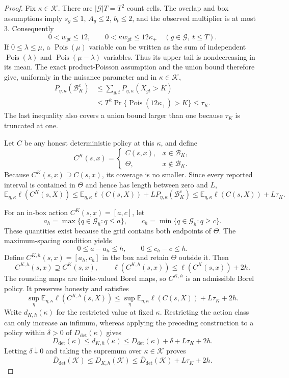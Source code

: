\documentclass{article}
\begin{document}
\begin{proof}
Fix \(\kappa\in\mathcal K\).  There are \(|\mathcal G|T=T^2\) count cells.  The overlap and box assumptions imply \(s_g\le 1\), \(A_g\le2\), \(b_t\le2\), and the observed multiplier is at most \(3\).  Consequently
\[
  0<w_{gt}\le 12,
  \qquad
  0<\kappa w_{gt}\le12\kappa_+
  \quad(g\in\mathcal G,\ t\le T).
\]
If \(0\le\lambda\le\mu\), a \(\operatorname{Pois}(\mu)\) variable can be written as the sum of independent \(\operatorname{Pois}(\lambda)\) and \(\operatorname{Pois}(\mu-\lambda)\) variables.  Thus its upper tail is nondecreasing in its mean.  The exact product-Poisson assumption and the union bound therefore give, uniformly in the nuisance parameter and in \(\kappa\in\mathcal K\),
\[
 \begin{split}
 P_{\eta,\kappa}(\mathcal B_K^c)
 &\le \sum_{g,t}P_{\eta,\kappa}(X_{gt}>K)\\
 &\le T^2\Pr\{\operatorname{Pois}(12\kappa_+)>K\}
 \le \tau_K .
 \end{split}
\]
The last inequality also covers a union bound larger than one because \(\tau_K\) is truncated at one.

Let \(C\) be any honest deterministic policy at this \(\kappa\), and define
\[
 C^K(s,x)=
 \begin{cases}
 C(s,x),&x\in\mathcal B_K,\\
 \Theta,&x\notin\mathcal B_K.
 \end{cases}
\]
Because \(C^K(s,x)\supseteq C(s,x)\), its coverage is no smaller.  Since every reported interval is contained in \(\Theta\) and hence has length between zero and \(L\),
\[
 \mathbb E_{\eta,\kappa}\ell(C^K(s,X))
 \le
 \mathbb E_{\eta,\kappa}\ell(C(s,X))
   +L P_{\eta,\kappa}(\mathcal B_K^c)
 \le
 \mathbb E_{\eta,\kappa}\ell(C(s,X))+L\tau_K .
\]

For an in-box action \(C^K(s,x)=[a,c]\), let
\[
 a_h=\max\{q\in\mathcal G_h:q\le a\},
 \qquad
 c_h=\min\{q\in\mathcal G_h:q\ge c\}.
\]
These quantities exist because the grid contains both endpoints of \(\Theta\).  The maximum-spacing condition yields
\[
 0\le a-a_h\le h,
 \qquad
 0\le c_h-c\le h.
\]
Define \(C^{K,h}(s,x)=[a_h,c_h]\) in the box and retain \(\Theta\) outside it.  Then
\[
 C^{K,h}(s,x)\supseteq C^K(s,x),
 \qquad
 \ell(C^{K,h}(s,x))\le\ell(C^K(s,x))+2h.
\]
The rounding maps are finite-valued Borel maps, so \(C^{K,h}\) is an admissible Borel policy.  It preserves honesty and satisfies
\[
 \sup_\eta\mathbb E_{\eta,\kappa}\ell(C^{K,h}(s,X))
 \le
 \sup_\eta\mathbb E_{\eta,\kappa}\ell(C(s,X))+L\tau_K+2h.
\]
Write \(d_{K,h}(\kappa)\) for the restricted value at fixed \(\kappa\).  Restricting the action class can only increase an infimum, whereas applying the preceding construction to a policy within \(\delta>0\) of \(D_{\mathrm{det}}(\kappa)\) gives
\[
 D_{\mathrm{det}}(\kappa)
 \le d_{K,h}(\kappa)
 \le D_{\mathrm{det}}(\kappa)+\delta+L\tau_K+2h.
\]
Letting \(\delta\downarrow0\) and taking the supremum over \(\kappa\in\mathcal K\) proves
\[
 \overline D_{\mathrm{det}}(\mathcal K)
 \le D_{K,h}(\mathcal K)
 \le \overline D_{\mathrm{det}}(\mathcal K)+L\tau_K+2h.
\]


\end{proof}
\end{document}
